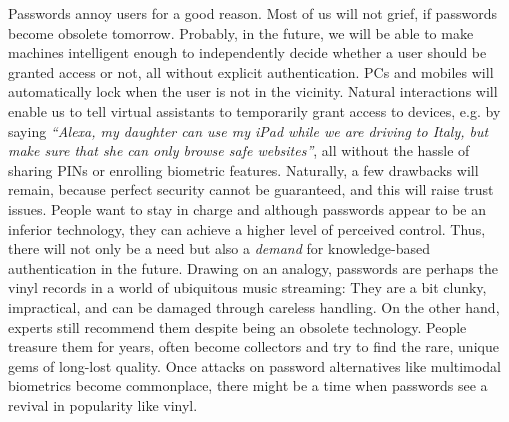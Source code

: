 Passwords annoy users for a good reason. Most of us will not grief, if passwords become obsolete tomorrow. Probably, in the future, we will be able to make machines intelligent enough to independently decide whether a user should be granted access or not, all without explicit authentication. PCs and mobiles will automatically lock when the user is not in the vicinity. Natural interactions will enable us to tell virtual assistants to temporarily grant access to devices, e.g. by saying \textit{``Alexa, my daughter can use my iPad while we are driving to Italy, but make sure that she can only browse safe websites''}, all without the hassle of sharing PINs or enrolling biometric features. Naturally, a few drawbacks will remain, because perfect security cannot be guaranteed, and this will raise trust issues. People want to stay in charge and although passwords appear to be an inferior technology, they can achieve a higher level of perceived control. Thus, there will not only be a need but also a \textit{demand} for knowledge-based authentication in the future. Drawing on an analogy, passwords are perhaps the vinyl records in a world of ubiquitous music streaming: They are a bit clunky, impractical, and can be damaged through careless handling. On the other hand, experts still recommend them despite being an obsolete technology. People treasure them for years, often become collectors and try to find the rare, unique gems of long-lost quality. Once attacks on password alternatives like multimodal biometrics become commonplace, there might be a time when passwords see a revival in popularity like vinyl. 





